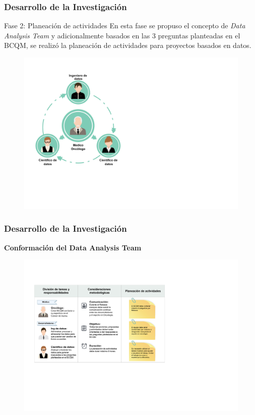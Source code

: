 \documentclass[xcolor=dvipsnames,xcolor=table,10pt]{beamer} %
\begin{document}
\begin{frame}
	\frametitle{Desarrollo de la Investigación}
	\begin{block}{Fase 2: Planeación de actividades}\justifying
	En esta fase se propuso el concepto de \textit{Data Analysis Team}  y adicionalmente basados en las 3 preguntas planteadas en el BCQM, se realizó la planeación de actividades para proyectos basados en datos.
	
	\end{block}
	
	\begin{figure}[h!]
		\centering
		\includegraphics[width=0.42\linewidth]{IMAGENES/Data_Analysis_Team}
	\end{figure}
\end{frame}

\begin{frame}
	\frametitle{Desarrollo de la Investigación}{\textbf{Conformación del Data Analysis Team}}
	\begin{figure}[h!]
		\centering
		\includegraphics[width=0.86\linewidth]{IMAGENES/Activity_Planning}
	\end{figure}
\end{frame}	
\end{document}
